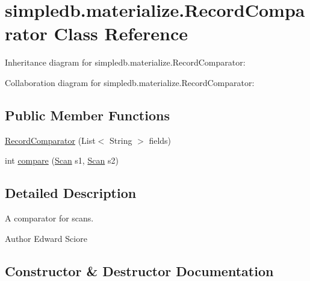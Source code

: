 \hypertarget{classsimpledb_1_1materialize_1_1RecordComparator}{}\section{simpledb.\+materialize.\+Record\+Comparator Class Reference}
\label{classsimpledb_1_1materialize_1_1RecordComparator}


Inheritance diagram for simpledb.\+materialize.\+Record\+Comparator\+:


Collaboration diagram for simpledb.\+materialize.\+Record\+Comparator\+:
\subsection*{Public Member Functions}
\begin{DoxyCompactItemize}
\item 
\hyperlink{classsimpledb_1_1materialize_1_1RecordComparator_a6195b7c5891f0869a26b6d2d56ddd93c}{Record\+Comparator} (List$<$ String $>$ fields)
\item 
int \hyperlink{classsimpledb_1_1materialize_1_1RecordComparator_a014bbee593c4642fb40d5debfb767da7}{compare} (\hyperlink{interfacesimpledb_1_1query_1_1Scan}{Scan} s1, \hyperlink{interfacesimpledb_1_1query_1_1Scan}{Scan} s2)
\end{DoxyCompactItemize}


\subsection{Detailed Description}
A comparator for scans. \begin{DoxyAuthor}{Author}
Edward Sciore 
\end{DoxyAuthor}


\subsection{Constructor \& Destructor Documentation}
\mbox{\label{classsimpledb_1_1materialize_1_1RecordComparator_a6195b7c5891f0869a26b6d2d56ddd93c}} 
